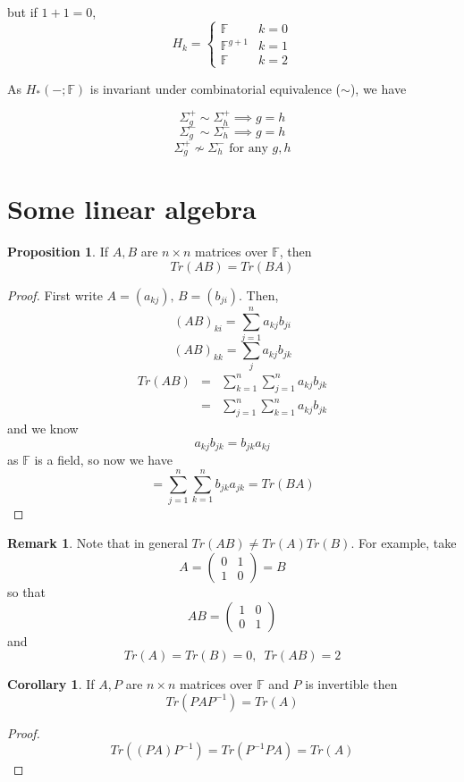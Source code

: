\documentclass[a4paper,14pt]{extarticle}
\theoremstyle{definition}
\newtheorem*{corollary}{Corollary}
\newtheorem*{proposition}{Proposition}
\newtheorem*{remark}{Remark}
\begin{document}
\noindent but if $1+1=0$,
\[H_k=\begin{cases}
	\mathbb{F}&k=0\\
	\mathbb{F}^{g+1}&k=1\\
	\mathbb{F}&k=2
\end{cases}
\]

\noindent As $H_*(-;\mathbb{F})$ is invariant under combinatorial equivalence ($\sim$),
we have 

\[\Sigma_g^+\sim\Sigma_h^+\implies g=h\]
\[\Sigma_g^-\sim\Sigma_h^-\implies g=h\]
\[\Sigma_g^+\not\sim\Sigma_h^-\text{ for any $g,h$}\]

\section{Some linear algebra}
\begin{proposition}
	If $A,B$ are $n\times n$ matrices over $\mathbb{F}$, then 
	\[Tr(AB)=Tr(BA)\]
\end{proposition}

\begin{proof}
	First write $A=(a_{kj}), \,B=(b_{ji})$. Then,
	\[(AB)_{ki}=\sum_{j=1}^n a_{kj}b_{ji}\]\[(AB)_{kk}=\sum_j a_{kj}b_{jk}\]
	\begin{eqnarray*}
		Tr(AB)&=&\sum_{k=1}^n\sum_{j=1}^n a_{kj}b_{jk} \\
		&=&\sum_{j=1}^n\sum_{k=1}^n a_{kj}b_{jk}
	\end{eqnarray*}
	and we know \[a_{kj}b_{jk}=b_{jk}a_{kj}\] as $\mathbb{F}$ is a field, so now 
	we have 
	\[=\sum_{j=1}^n\sum_{k=1}^n b_{jk}a_{jk}=Tr(BA)\]
\end{proof}

\begin{remark}
	Note that in general $Tr(AB)\neq Tr(A)Tr(B)$. For example, take 
	\[A=\begin{pmatrix}
		0&1\\1&0
	\end{pmatrix}=B\] so that \[AB=\begin{pmatrix}
		1&0\\0&1
	\end{pmatrix}\] and \[Tr(A)=Tr(B)=0,\,\,\,Tr(AB)=2\]
\end{remark}

\begin{corollary}
	If $A,P$ are $n\times n$ matrices over $\mathbb{F}$ and $P$ is invertible then 
	\[Tr(PAP^{-1})=Tr(A)\]
\end{corollary}

\begin{proof}
	\[Tr((PA)P^{-1})=Tr(P^{-1}PA)=Tr(A)\]
\end{proof}
\end{document}
